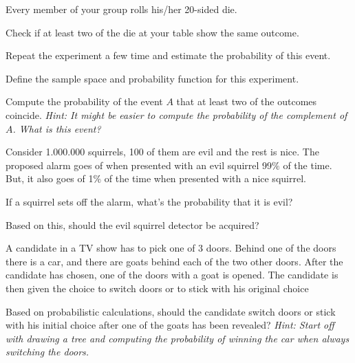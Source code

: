 \documentclass[10pt, a5paper]{scrartcl}
\begin{document}
\boardquestions

\begin{exercise}
	\begin{subex}
		Every member of your group rolls his/her 20-sided die.	
	\end{subex}
	
	\begin{subex}
		Check if at least two of the die at your table show the same
	  outcome.
	\end{subex}
	
	\begin{subex}
		Repeat the experiment a few time and estimate the probability of
	  this event.	
	\end{subex}
	
	\begin{subex}
		Define the sample space and probability function for this
	  experiment.	
	\end{subex}
	
	\begin{subex}
		Compute the probability of the event $A$ that at least two of
	  the outcomes coincide. \emph{Hint: It might be easier to compute the probability
	  of the complement of $A$. What is this event?}
	\end{subex}
\end{exercise}

\begin{exercise}
Consider 1.000.000 squirrels, 100 of them are evil and the rest is nice. 
The proposed alarm goes of when presented with an evil squirrel 99$\%$ of the time. 
But, it also goes of 1$\%$ of the time when presented with a nice squirrel.

	\begin{subex}
		If a squirrel sets off the alarm, what's the probability that it is evil?
	\end{subex}
	
	\begin{subex}
		Based on this, should the evil squirrel detector be acquired?
	\end{subex}
\end{exercise}


\begin{exercise}
A candidate in a TV show has to pick one of 3 doors. Behind one of the doors there is a car, and there are goats behind each of the two other doors. After the candidate has chosen, one of the doors with a goat is opened. The candidate is then given the choice to switch doors or to stick with his original choice

	Based on probabilistic calculations, should the	candidate switch doors or stick with his initial choice after one of the goats has been revealed?
	\emph{Hint: Start off with drawing a tree and computing the probability of winning the car when always switching the doors.}
\end{exercise}


\vfill
{}
\end{document}
